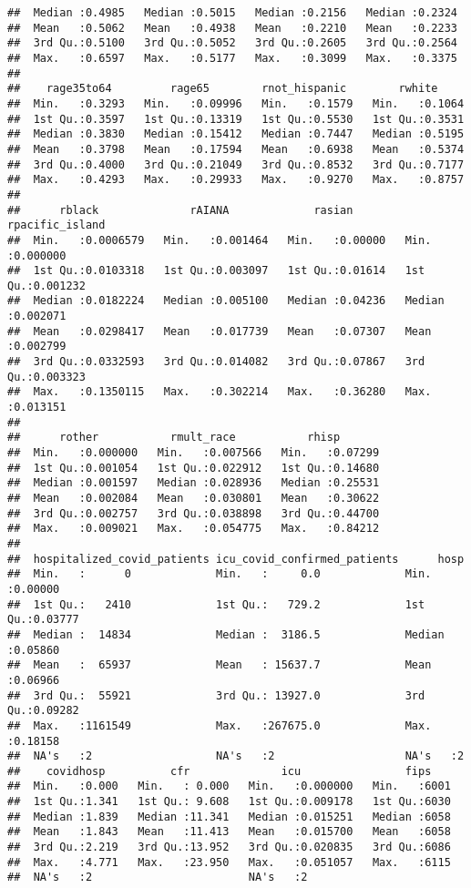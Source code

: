 \documentclass[
]{article}
\begin{document}
\begin{verbatim}
##  Median :0.4985   Median :0.5015   Median :0.2156   Median :0.2324  
##  Mean   :0.5062   Mean   :0.4938   Mean   :0.2210   Mean   :0.2233  
##  3rd Qu.:0.5100   3rd Qu.:0.5052   3rd Qu.:0.2605   3rd Qu.:0.2564  
##  Max.   :0.6597   Max.   :0.5177   Max.   :0.3099   Max.   :0.3375  
##                                                                     
##    rage35to64         rage65        rnot_hispanic        rwhite      
##  Min.   :0.3293   Min.   :0.09996   Min.   :0.1579   Min.   :0.1064  
##  1st Qu.:0.3597   1st Qu.:0.13319   1st Qu.:0.5530   1st Qu.:0.3531  
##  Median :0.3830   Median :0.15412   Median :0.7447   Median :0.5195  
##  Mean   :0.3798   Mean   :0.17594   Mean   :0.6938   Mean   :0.5374  
##  3rd Qu.:0.4000   3rd Qu.:0.21049   3rd Qu.:0.8532   3rd Qu.:0.7177  
##  Max.   :0.4293   Max.   :0.29933   Max.   :0.9270   Max.   :0.8757  
##                                                                      
##      rblack              rAIANA             rasian        rpacific_island   
##  Min.   :0.0006579   Min.   :0.001464   Min.   :0.00000   Min.   :0.000000  
##  1st Qu.:0.0103318   1st Qu.:0.003097   1st Qu.:0.01614   1st Qu.:0.001232  
##  Median :0.0182224   Median :0.005100   Median :0.04236   Median :0.002071  
##  Mean   :0.0298417   Mean   :0.017739   Mean   :0.07307   Mean   :0.002799  
##  3rd Qu.:0.0332593   3rd Qu.:0.014082   3rd Qu.:0.07867   3rd Qu.:0.003323  
##  Max.   :0.1350115   Max.   :0.302214   Max.   :0.36280   Max.   :0.013151  
##                                                                             
##      rother           rmult_race           rhisp        
##  Min.   :0.000000   Min.   :0.007566   Min.   :0.07299  
##  1st Qu.:0.001054   1st Qu.:0.022912   1st Qu.:0.14680  
##  Median :0.001597   Median :0.028936   Median :0.25531  
##  Mean   :0.002084   Mean   :0.030801   Mean   :0.30622  
##  3rd Qu.:0.002757   3rd Qu.:0.038898   3rd Qu.:0.44700  
##  Max.   :0.009021   Max.   :0.054775   Max.   :0.84212  
##                                                         
##  hospitalized_covid_patients icu_covid_confirmed_patients      hosp        
##  Min.   :      0             Min.   :     0.0             Min.   :0.00000  
##  1st Qu.:   2410             1st Qu.:   729.2             1st Qu.:0.03777  
##  Median :  14834             Median :  3186.5             Median :0.05860  
##  Mean   :  65937             Mean   : 15637.7             Mean   :0.06966  
##  3rd Qu.:  55921             3rd Qu.: 13927.0             3rd Qu.:0.09282  
##  Max.   :1161549             Max.   :267675.0             Max.   :0.18158  
##  NA's   :2                   NA's   :2                    NA's   :2        
##    covidhosp          cfr              icu                fips     
##  Min.   :0.000   Min.   : 0.000   Min.   :0.000000   Min.   :6001  
##  1st Qu.:1.341   1st Qu.: 9.608   1st Qu.:0.009178   1st Qu.:6030  
##  Median :1.839   Median :11.341   Median :0.015251   Median :6058  
##  Mean   :1.843   Mean   :11.413   Mean   :0.015700   Mean   :6058  
##  3rd Qu.:2.219   3rd Qu.:13.952   3rd Qu.:0.020835   3rd Qu.:6086  
##  Max.   :4.771   Max.   :23.950   Max.   :0.051057   Max.   :6115  
##  NA's   :2                        NA's   :2
\end{verbatim}
\end{document}
